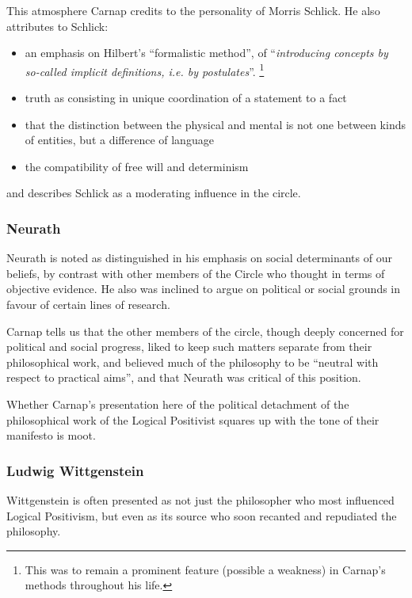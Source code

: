 \documentclass[10pt,titlepage]{book}
\begin{document}
This atmosphere Carnap credits to the personality of Morris Schlick.
He also attributes to Schlick:
\begin{itemize}
\item an emphasis on Hilbert's ``formalistic method'', of ``\emph{introducing concepts by so-called implicit definitions, i.e. by postulates}''.
\footnote{This was to remain a prominent feature (possible a weakness) in Carnap's methods throughout his life.}

\item truth as consisting in unique coordination of a statement to a fact

\item that the distinction between the physical and mental is not one between kinds of entities, but a difference of language

\item the compatibility of free will and determinism

\end{itemize}

and describes Schlick as a moderating influence in the circle.

\subsubsection{Neurath}

Neurath is noted as distinguished in his emphasis on social determinants of our beliefs, by contrast with other members of the Circle who thought in terms of objective evidence.
He also was inclined to argue on political or social grounds in favour of certain lines of research.

Carnap tells us that the other members of the circle, though deeply concerned for political and social progress, liked to keep such matters separate from their philosophical work, and believed much of the philosophy to be ``neutral with respect to practical aims'', and that Neurath was critical of this position.

Whether Carnap's presentation here of the political detachment of the philosophical work of the Logical Positivist squares up with the tone of their manifesto is moot. 

\subsubsection{Ludwig Wittgenstein}

Wittgenstein is often presented as not just the philosopher who most influenced Logical Positivism, but even as its source who soon recanted and repudiated the philosophy.
\end{document}
